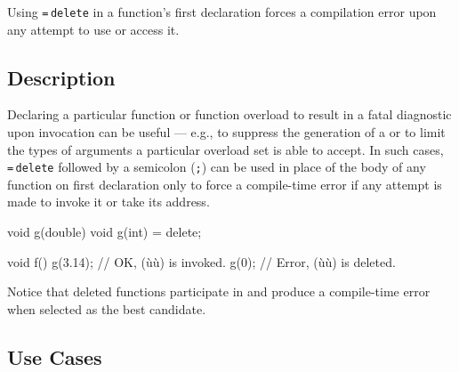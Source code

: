
\setcounter{table}{0}
\setcounter{footnote}{0}
\setcounter{lstlisting}{0}




Using \lstinline!=!\,\lstinline!delete! in a function's first declaration
forces a compilation error upon any attempt to use or access it.

\subsection[Description]{Description}\label{description}

Declaring a particular function or function overload to result in a
fatal diagnostic upon invocation can be useful --- e.g., to suppress the
generation of a  or to limit the types of
arguments a particular overload set is able to accept. In such cases,
\lstinline!=!\,\lstinline!delete! followed by a semicolon (\lstinline!;!) can be used in place of the body of any
function on first declaration only to force a compile-time error if
any attempt is made to invoke it or take its address.

\begin{emcppslisting}
void g(double) { }
void g(int) = delete;

void f()
{
    g(3.14);  // OK, (ù{}ù) is invoked.
    g(0);     // Error, (ù{}ù) is deleted.
}
\end{emcppslisting}

\noindent Notice that deleted functions participate in 
and produce a compile-time error when selected as the best candidate.

\subsection[Use Cases]{Use Cases}\label{use-cases}

